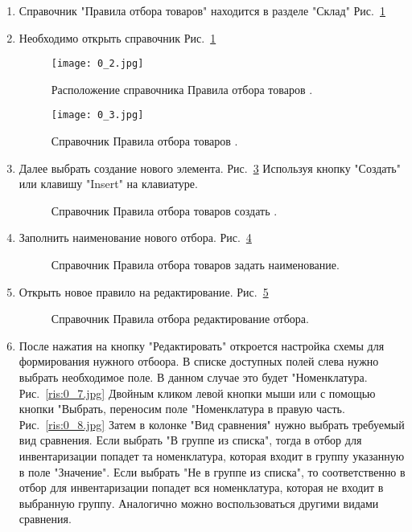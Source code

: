 \begin{enumerate}	
	\item Справочник "Правила отбора товаров" находится в разделе "Склад" Рис.~\ref{ris:0_2.jpg}
	\item Необходимо открыть справочник Рис.~\ref{ris:0_2.jpg}
	\begin{figure}[H]
		\texttt{[image: 0\_2.jpg]}
		\caption{Расположение справочника Правила отбора товаров .}
		\label{ris:0_2.jpg}
	\end{figure}
	\begin{figure}[H]
		\texttt{[image: 0\_3.jpg]}
		\caption{Справочник Правила отбора товаров .}
		\label{ris:0_3.jpg}
	\end{figure}	
	\item Далее выбрать создание нового элемента. Рис.~\ref{ris:0_4.jpg} Используя кнопку "Создать" или клавишу "Insert"  на клавиатуре.	
	\begin{figure}[H]
		\caption{Справочник Правила отбора товаров создать .}
		\label{ris:0_4.jpg}
	\end{figure}
	\item Заполнить наименование нового отбора. Рис.~\ref{ris:0_5.jpg}	
	\begin{figure}[H]
		\caption{Справочник Правила отбора товаров задать наименование.}
		\label{ris:0_5.jpg}
	\end{figure}
	\item Открыть новое правило на редактирование. Рис.~\ref{ris:0_6.jpg}	
	\begin{figure}[H]
		\caption{Справочник Правила отбора редактирование отбора.}
		\label{ris:0_6.jpg}
	\end{figure}
	\item После нажатия на кнопку "Редактировать" откроется настройка схемы для формирования нужного отбоора. В списке доступных полей слева нужно выбрать необходимое поле. В данном случае это будет "Номенклатура. Рис.~\ref{ris:0_7.jpg} Двойным кликом левой кнопки мыши или с помощью кнопки "Выбрать, переносим поле "Номенклатура в правую часть.  Рис.~\ref{ris:0_8.jpg} Затем в колонке "Вид сравнения" нужно выбрать требуемый вид сравнения. Если выбрать "В группе из списка", тогда в отбор для инвентаризации попадет та номенклатура, которая входит в группу указанную в поле "Значение". Если выбрать "Не в группе из списка", то соответственно в отбор для инвентаризации попадет вся номенклатура, которая не входит в выбранную группу. 
	Аналогично можно воспользоваться другими видами сравнения.
	

\end{enumerate}
